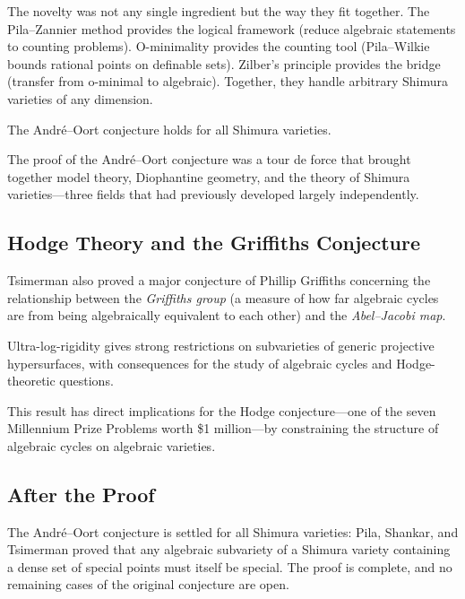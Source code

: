 The novelty was not any single ingredient but the way they fit together. The Pila--Zannier method provides the logical framework (reduce algebraic statements to counting problems). O-minimality provides the counting tool (Pila--Wilkie bounds rational points on definable sets). Zilber's principle provides the bridge (transfer from o-minimal to algebraic). Together, they handle arbitrary Shimura varieties of any dimension.

\begin{theorem}
The Andr\'{e}--Oort conjecture holds for all Shimura varieties.
\end{theorem}

\begin{highlightbox}
The proof of the Andr\'{e}--Oort conjecture was a tour de force that brought together model theory, Diophantine geometry, and the theory of Shimura varieties---three fields that had previously developed largely independently.
\end{highlightbox}

\subsection{Hodge Theory and the Griffiths Conjecture}

Tsimerman also proved a major conjecture of Phillip Griffiths concerning the relationship between the \emph{Griffiths group} (a measure of how far algebraic cycles are from being algebraically equivalent to each other) and the \emph{Abel--Jacobi map}.

\begin{theorem}
Ultra-log-rigidity gives strong restrictions on subvarieties of generic projective hypersurfaces, with consequences for the study of algebraic cycles and Hodge-theoretic questions.
\end{theorem}

This result has direct implications for the Hodge conjecture---one of the seven Millennium Prize Problems worth \$1 million---by constraining the structure of algebraic cycles on algebraic varieties.

\subsection{After the Proof}

The Andr\'{e}--Oort conjecture is settled for all Shimura varieties: Pila, Shankar, and Tsimerman proved that any algebraic subvariety of a Shimura variety containing a dense set of special points must itself be special. The proof is complete, and no remaining cases of the original conjecture are open.

